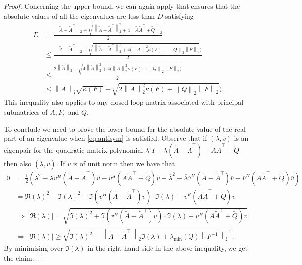 \documentclass[a4paper,10pt]{article}
\newcommand{\norm}[1]{\left\lVert#1\right\rVert}
\newcommand{\upd}[1]{{\color{black}#1}} %
\begin{document}
\begin{proof}
	Concerning the upper bound, we can again apply \cite[Theorem 3.4]{melman2013generalization} that ensures that the absolute values of all the eigenvalues are less than $D$ satisfying
	\begin{align*}
		D&=\frac{\norm{\widetilde A-\widetilde A^\top}_2+\sqrt{\norm{\widetilde A-\widetilde A^\top}_2^2+4\norm{\widetilde A\widetilde A^\top+\widetilde Q}_2}}2\\
		&\le \frac{\norm{\widetilde A-\widetilde A^\top}_2+\sqrt{\norm{\widetilde A-\widetilde A^\top}_2^2+4(\norm{A}_2^2\kappa(F)+\norm{Q}_2\norm{F}_2})}2\\
		&\le \frac{2\norm{\widetilde A}_2+\sqrt{4\norm{\widetilde A}_2^2+4(\norm{A}_2^2\kappa(F)+\norm{Q}_2\norm{F}_2})}2\\
		&\le \norm{A}_2\sqrt{\kappa(F)}+\sqrt{2\norm{A}_2^2\kappa(F)+\norm{Q}_2\norm{F}_2}).
	\end{align*}
	This inequality also applies to any closed-loop matrix associated with principal submatrices of $A,F,$ and $Q$.
	
	To conclude we need to prove the lower bound for the absolute value of the real part of an eigenvalue when \eqref{eq:antisym} is satisfied. Observe that if $(\lambda,v)$ is an eigenpair for the quadratic matrix polynomial $\lambda^2I-\lambda(\widetilde A-\widetilde A^\top)-\widetilde A\widetilde A^\top-\widetilde Q$ then also $(\overline{\lambda},\overline{v})$. If $v$ is of unit norm then we have that
	\begin{align*}
	0&=\frac{1}{2}\left( \lambda^2 -\lambda v^H(\widetilde A-\widetilde A^\top)v-v^H(A\widetilde A^\top+\widetilde Q)v+\overline{\lambda}^2 -\overline{\lambda}\overline{v}^H(\widetilde A-\widetilde A^\top)\overline{v}-\overline{v}^H(A\widetilde A^\top+\widetilde Q)\overline{v}\right)\\	
	&=\Re(\lambda)^2-\Im(\lambda)^2-\Im( v^H(\widetilde A-\widetilde A^\top)v)\cdot  \Im(\lambda) - v^H(A\widetilde A^\top+\widetilde Q)v\\
	&\Rightarrow\ |\Re(\lambda)| = \sqrt{\Im(\lambda)^2+ \Im( v^H(\widetilde A-\widetilde A^\top)v)\cdot  \Im(\lambda) + v^H(A\widetilde A^\top+\widetilde Q)v}\\
		&\Rightarrow\ |\Re(\lambda)| \ge \sqrt{\Im(\lambda)^2-\norm{\tilde A-\tilde{A}^\top}_2\Im(\lambda) +\lambda_{\min}(Q)\norm{F^{-1}}_2^{-1}}
	.
	\end{align*}
By minimizing over $\Im(\lambda)$ \upd{in} the right-hand side  in the above inequality, we get the claim. 
\end{proof}
\end{document}
